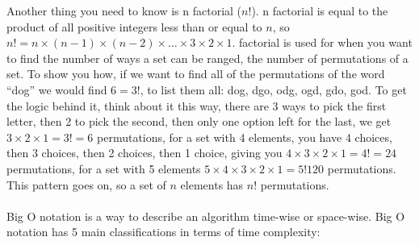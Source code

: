   Another thing you need to know is n factorial ($n!$). n factorial is equal to the product of all positive integers less than or equal to $n$, so $n!=n \times (n-1) \times (n-2) \times \dots \times 3 \times 2 \times 1$. factorial is used for when you want to find the number of ways a set can be ranged, the number of permutations of a set. To show you how, if we want to find all of the permutations of the word ``dog'' we would find $6=3!$, to list them all: dog, dgo, odg, ogd, gdo, god. To get the logic behind it, think about it this way, there are 3 ways to pick the first letter, then 2 to pick the second, then only one option left for the last, we get $3 \times 2 \times 1 = 3! = 6$ permutations, for a set with 4 elements, you have 4 choices, then 3 choices, then 2 choices, then 1 choice, giving you $4 \times 3 \times 2 \times 1 =  4! = 24$ permutations, for a set with 5 elements $5 \times 4 \times 3 \times 2 \times 1 = 5! 120$ permutations. This pattern goes on, so a set of $n$ elements has $n!$ permutations.\\ \\
  \noindent
  Big O notation is a way to describe an algorithm time-wise or space-wise. Big O notation has 5 main classifications in terms of time complexity:
